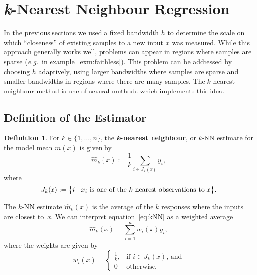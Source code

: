 \documentclass[
  a4paper,
]{article}
\theoremstyle{definition}
\newtheorem{definition}{Definition}[section]
\theoremstyle{definition}
\theoremstyle{definition}
\theoremstyle{definition}
\theoremstyle{remark}
\begin{document}
\clearpage

\hypertarget{X07-nearest}{%
\section{\texorpdfstring{\emph{k}-Nearest Neighbour Regression}{k-Nearest Neighbour Regression}}\label{X07-nearest}}

In the previous sections we used a fixed bandwidth \(h\) to determine the
scale on which ``closeness'' of existing samples to a new input \(x\) was
measured. While this approach generally works well, problems can appear
in regions where samples are sparse (\emph{e.g.}~in
example~\ref{exm:faithless}). This problem can be addressed by choosing
\(h\) adaptively, using larger bandwidths where samples are sparse and
smaller bandwidths in regions where there are many samples. The
\(k\)-nearest neighbour method is one of several methods which implements
this idea.

\hypertarget{definition-of-the-estimator}{%
\subsection{Definition of the Estimator}\label{definition-of-the-estimator}}

\begin{definition}
For \(k \in \{1, \ldots, n\}\), the \textbf{\emph{k}-nearest neighbour}, or
\(k\)-NN estimate for the model mean \(m(x)\) is given by
\begin{equation}
  \hat m_k(x)
  := \frac1k \sum_{i\in J_k(x)} y_i,  \label{eq:kNN}
\end{equation}
where
\begin{equation*}
  J_k(x)
  := \bigl\{ i \bigm| \mbox{$x_i$ is one of the $k$ nearest observations to $x$} \bigr\}.
\end{equation*}
\end{definition}

The \(k\)-NN estimate \(\hat m_k(x)\) is the average of the \(k\) responses
where the inputs are closest to~\(x\). We can interpret
equation~\eqref{eq:kNN} as a weighted average \begin{equation*}
  \hat m_k(x)
  = \sum_{i=1}^n w_i(x) y_i,
\end{equation*} where the weights are given by \begin{equation*}
  w_i(x)
  = \begin{cases}
      \frac1k, & \mbox{if $i \in J_k(x)$, and} \\
      0 & \mbox{otherwise.}
  \end{cases}
\end{equation*}
\end{document}
